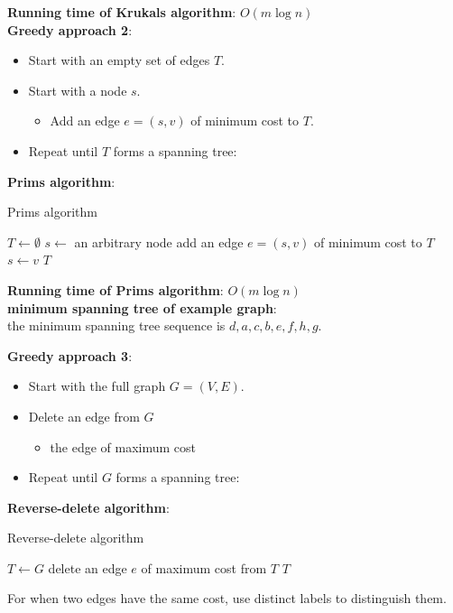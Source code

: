 \documentclass[onecolumn]{report}
\begin{document}
\noindent
\textbf{Running time of Krukals algorithm}: $O(m\log n)$\\
\textbf{Greedy approach 2}:
\begin{itemize}
    \item Start with an empty set of edges $T$.
    \item Start with a node $s$.
    \begin{itemize}
        \item Add an edge $e=(s,v)$ of minimum cost to $T$.
    \end{itemize}
    \item Repeat until $T$ forms a spanning tree:
\end{itemize}
\textbf{Prims algorithm}:
\begin{algorithm}[H]
\caption{Prims algorithm}
\begin{algorithmic}[1]
\State $T \gets \emptyset$
\State $s \gets$ an arbitrary node
\State add an edge $e=(s,v)$ of minimum cost to $T$
\State $s \gets v$
\EndWhile
\State \Return $T$
\EndProcedure
\end{algorithmic}
\end{algorithm}
\noindent
\textbf{Running time of Prims algorithm}: $O(m\log n)$\\
\textbf{minimum spanning tree of example graph}:\\
the minimum spanning tree sequence is $d,a,c,b,e,f,h,g$.\\
\noindent

\textbf{Greedy approach 3}:\\
\begin{itemize}
    \item Start with the full graph $G=(V,E)$.
    \item Delete an edge from $G$
    \begin{itemize}
        \item the edge of maximum cost
    \end{itemize}
    \item Repeat until $G$ forms a spanning tree:
\end{itemize}
\textbf{Reverse-delete algorithm}:
\begin{algorithm}[H]
\caption{Reverse-delete algorithm}
\begin{algorithmic}[1]
\State $T \gets G$
\State delete an edge $e$ of maximum cost from $T$
\EndWhile
\State \Return $T$
\EndProcedure
\end{algorithmic}
\end{algorithm}
\noindent
For when two edges have the same cost, use distinct labels to distinguish them.\\
\end{document}
